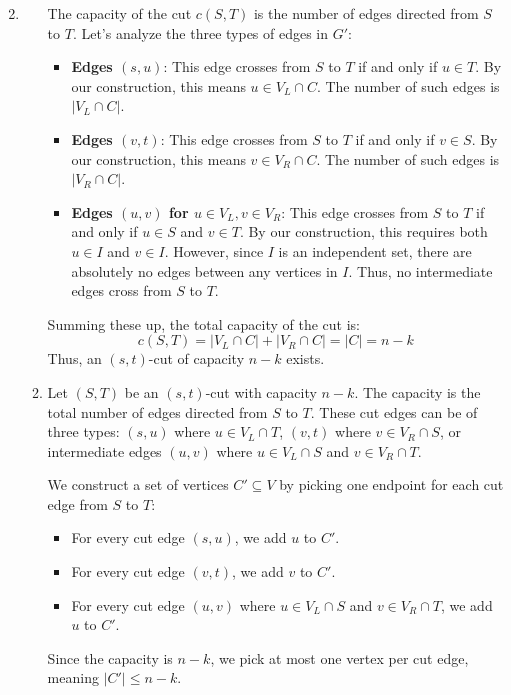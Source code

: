 \documentclass[12pt,a4paper]{article}
\makeatletter
\newtheorem*{solution}{Solution}
\theoremstyle{definition}
\renewenvironment{solution}[1][Solution] {\par\pushQED{\qed}\normalfont\topsep6\p@\@plus6\p@\relax\trivlist\item[\hskip\labelsep\bfseries#1\@addpunct{.}]\ignorespaces}{\popQED\endtrivlist\@endpefalse} \makeatother
\makeatother
\begin{document}
\begin{enumerate}
\begin{solution}
\begin{enumerate}
    The capacity of the cut $c(S, T)$ is the number of edges directed from $S$ to $T$. Let's analyze the three types of edges in $G'$:
    \begin{itemize}
        \item \textbf{Edges $(s, u)$}: This edge crosses from $S$ to $T$ if and only if $u \in T$. By our construction, this means $u \in V_L \cap C$. The number of such edges is $|V_L \cap C|$.
        \item \textbf{Edges $(v, t)$}: This edge crosses from $S$ to $T$ if and only if $v \in S$. By our construction, this means $v \in V_R \cap C$. The number of such edges is $|V_R \cap C|$.
        \item \textbf{Edges $(u, v)$ for $u \in V_L, v \in V_R$}: This edge crosses from $S$ to $T$ if and only if $u \in S$ and $v \in T$. By our construction, this requires both $u \in I$ and $v \in I$. However, since $I$ is an independent set, there are absolutely no edges between any vertices in $I$. Thus, no intermediate edges cross from $S$ to $T$.
    \end{itemize}
    
    Summing these up, the total capacity of the cut is:
    $$c(S, T) = |V_L \cap C| + |V_R \cap C| = |C| = n - k$$
    Thus, an $(s, t)$-cut of capacity $n - k$ exists.

    \item   Let $(S, T)$ be an $(s, t)$-cut with capacity $n - k$. The capacity is the total number of edges directed from $S$ to $T$. These cut edges can be of three types:
    $(s, u)$ where $u \in V_L \cap T$, $(v, t)$ where $v \in V_R \cap S$, or intermediate edges $(u, v)$ where $u \in V_L \cap S$ and $v \in V_R \cap T$.
    
    We construct a set of vertices $C' \subseteq V$ by picking one endpoint for each cut edge from $S$ to $T$:
    \begin{itemize}
        \item For every cut edge $(s, u)$, we add $u$ to $C'$.
        \item For every cut edge $(v, t)$, we add $v$ to $C'$.
        \item For every cut edge $(u, v)$ where $u \in V_L \cap S$ and $v \in V_R \cap T$, we add $u$ to $C'$.
    \end{itemize}
    Since the capacity is $n - k$, we pick at most one vertex per cut edge, meaning $|C'| \le n - k$.
    

\end{enumerate}
\end{solution}
\end{enumerate}
\end{document}
